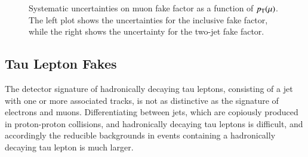 \begin{figure}
  \centering
  \caption{Systematic uncertainties on muon fake factor as a function of $p_{\text{T}}(\mu)$.  The left plot shows the uncertainties for the inclusive fake factor, while the right shows the uncertainty for the two-jet fake factor.}
  \label{fig:MuFake_syst}
\end{figure}



\subsection{Tau Lepton Fakes}\label{sec:ff-tau}
The detector signature of hadronically decaying tau leptons, consisting of a jet with one or more associated tracks, is not as distinctive as the signature of electrons and muons. Differentiating between jets, which are copiously produced in proton-proton collisions, and hadronically decaying tau leptons is difficult, and accordingly the reducible backgrounds in events containing a hadronically decaying tau lepton is much larger. 

